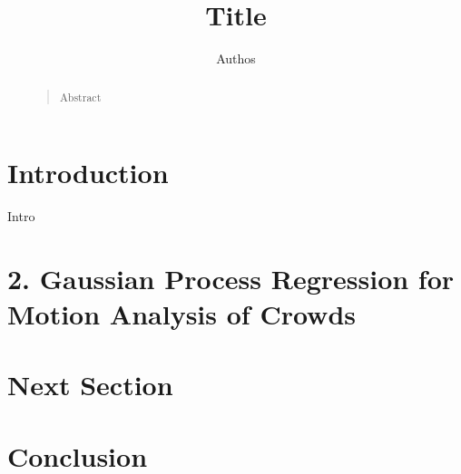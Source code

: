 \documentclass[letterpaper]{article}
\begin{document}
%
\title{Title}
\author{Authos}
\maketitle
\begin{abstract}
\begin{quote}
Abstract
\end{quote}
\end{abstract}

\section{Introduction}
Intro
\section{2.  Gaussian Process Regression for Motion Analysis of Crowds}

\section{Next Section}

\section{Conclusion}
\end{document}
